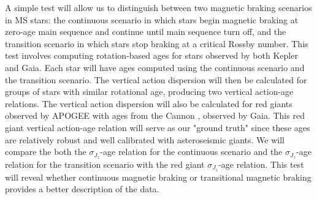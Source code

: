 \documentclass[12pt]{article}
\begin{document}
A simple test will allow us to distinguish between two magnetic braking
scenarios in MS stars: the continuous scenario in which stars begin magnetic
braking at zero-age main sequence and continue until main sequence turn off,
and the transition scenario in which stars stop braking at a critical Rossby
number.
This test involves computing rotation-based ages for stars observed by both
Kepler and Gaia.
Each star will have ages computed using the continuous scenario and the
transition scenario.
The vertical action dispersion will then be calculated for groups of stars
with similar rotational age, producing two vertical action-age relations.
The vertical action dispersion will also be calculated for red giants observed
by APOGEE with ages from the Cannon \citep{Ness2015}, observed by Gaia.
This red giant vertical action-age relation will serve as our "ground truth"
since these ages are relatively robust and well calibrated with asteroseismic
giants.
We will compare the both the $\sigma_{J_z}$-age relation for the continuous
scenario and the $\sigma_{J_z}$-age relation for the transition scenario with
the red giant $\sigma_{J_z}$-age relation.
This test will reveal whether continuous magnetic braking or transitional
magnetic braking provides a better description of the data.
\end{document}
